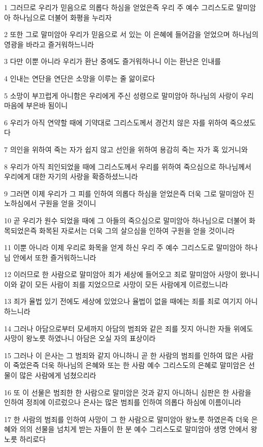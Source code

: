 \par 1 그러므로 우리가 믿음으로 의롭다 하심을 얻었은즉 우리 주 예수 그리스도로 말미암아 하나님으로 더불어 화평을 누리자
\par 2 또한 그로 말미암아 우리가 믿음으로 서 있는 이 은혜에 들어감을 얻었으며 하나님의 영광을 바라고 즐거워하느니라
\par 3 다만 이뿐 아니라 우리가 환난 중에도 즐거워하나니 이는 환난은 인내를
\par 4 인내는 연단을 연단은 소망을 이루는 줄 앎이로다
\par 5 소망이 부끄럽게 아니함은 우리에게 주신 성령으로 말미암아 하나님의 사랑이 우리 마음에 부은바 됨이니
\par 6 우리가 아직 연약할 때에 기약대로 그리스도께서 경건치 않은 자를 위하여 죽으셨도다
\par 7 의인을 위하여 죽는 자가 쉽지 않고 선인을 위하여 용감히 죽는 자가 혹 있거니와
\par 8 우리가 아직 죄인되었을 때에 그리스도께서 우리를 위하여 죽으심으로 하나님께서 우리에게 대한 자기의 사랑을 확증하셨느니라
\par 9 그러면 이제 우리가 그 피를 인하여 의롭다 하심을 얻었은즉 더욱 그로 말미암아 진노하심에서 구원을 얻을 것이니
\par 10 곧 우리가 원수 되었을 때에 그 아들의 죽으심으로 말미암아 하나님으로 더불어 화목되었은즉 화목된 자로서는 더욱 그의 살으심을 인하여 구원을 얻을 것이니라
\par 11 이뿐 아니라 이제 우리로 화목을 얻게 하신 우리 주 예수 그리스도로 말미암아 하나님 안에서 또한 즐거워하느니라
\par 12 이러므로 한 사람으로 말미암아 죄가 세상에 들어오고 죄로 말미암아 사망이 왔나니 이와 같이 모든 사람이 죄를 지었으므로 사망이 모든 사람에게 이르렀느니라
\par 13 죄가 율법 있기 전에도 세상에 있었으나 율법이 없을 때에는 죄를 죄로 여기지 아니하느니라
\par 14 그러나 아담으로부터 모세까지 아담의 범죄와 같은 죄를 짓지 아니한 자들 위에도 사망이 왕노릇 하였나니 아담은 오실 자의 표상이라
\par 15 그러나 이 은사는 그 범죄와 같지 아니하니 곧 한 사람의 범죄를 인하여 많은 사람이 죽었은즉 더욱 하나님의 은혜와 또는 한 사람 예수 그리스도의 은혜로 말미암은 선물이 많은 사람에게 넘쳤으리라
\par 16 또 이 선물은 범죄한 한 사람으로 말미암은 것과 같지 아니하니 심판은 한 사람을 인하여 정죄에 이르렀으나 은사는 많은 범죄를 인하여 의롭다 하심에 이름이니라
\par 17 한 사람의 범죄를 인하여 사망이 그 한 사람으로 말미암아 왕노릇 하였은즉 더욱 은혜와 의의 선물을 넘치게 받는 자들이 한 분 예수 그리스도로 말미암아 생명 안에서 왕노릇 하리로다
